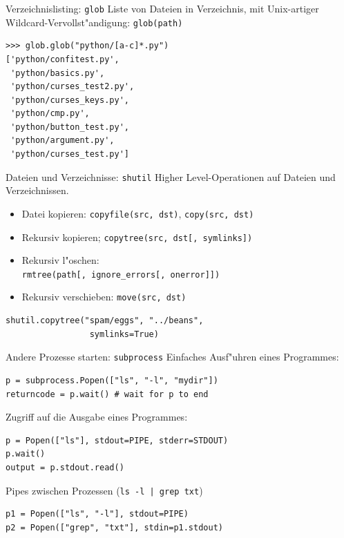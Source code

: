 \begin{frame}[fragile]{Verzeichnislisting: \texttt{glob}}
Liste von Dateien in Verzeichnis, mit Unix-artiger Wildcard-Vervollst"andigung: \texttt{glob(path)}
\begin{lstlisting}[style=Shell]
>>> glob.glob("python/[a-c]*.py")
['python/confitest.py',
 'python/basics.py',
 'python/curses_test2.py',
 'python/curses_keys.py',
 'python/cmp.py',
 'python/button_test.py',
 'python/argument.py',
 'python/curses_test.py']
\end{lstlisting}
\end{frame}

\begin{frame}[fragile]{Dateien und Verzeichnisse: \texttt{shutil}}
Higher Level-Operationen auf Dateien und Verzeichnissen.
\begin{itemize}
\item Datei kopieren: \texttt{copyfile(src, dst)}, \texttt{copy(src, dst)}
\item Rekursiv kopieren; \texttt{copytree(src, dst[, symlinks])}
\item Rekursiv l"oschen: \\\texttt{rmtree(path[, ignore\_errors[, onerror]])}
\item Rekursiv verschieben: \texttt{move(src, dst)}
\end{itemize}
\begin{lstlisting}[style=Python]
shutil.copytree("spam/eggs", "../beans", 
                 symlinks=True)
\end{lstlisting}
\end{frame}

\begin{frame}[fragile]{Andere Prozesse starten: \texttt{subprocess}}
Einfaches Ausf"uhren eines Programmes:
\begin{lstlisting}[style=Python]
p = subprocess.Popen(["ls", "-l", "mydir"])
returncode = p.wait() # wait for p to end
\end{lstlisting}
Zugriff auf die Ausgabe eines Programmes:
\begin{lstlisting}[style=Python]
p = Popen(["ls"], stdout=PIPE, stderr=STDOUT) 
p.wait()
output = p.stdout.read()
\end{lstlisting}
Pipes zwischen Prozessen (\lstinline{ls -l | grep txt})
\begin{lstlisting}[style=Python]
p1 = Popen(["ls", "-l"], stdout=PIPE)
p2 = Popen(["grep", "txt"], stdin=p1.stdout)
\end{lstlisting}
\end{frame}

